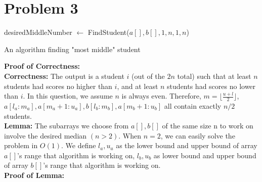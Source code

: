 \documentclass{article}
\begin{document}
\section{Problem 3}
\begin{algorithm}[!ht]
\DontPrintSemicolon
{}
    
    desiredMiddleNumber $\leftarrow$ FindStudent($a[],b[],1,n,1,n$)
      \;
\caption{An algorithm finding "most middle" student}
\end{algorithm}
\textbf{Proof of Correctness:}\\
\textbf{Correctness:} The output is a student $i$ (out
of the $2n$ total) such that at least $n$ students had scores no higher than $i$, and at least $n$ students had scores no lower than $i$. In this question, we assume $n$ is always even. Therefore, $m = \lfloor\frac{u+l}{2}\rfloor$, $a[l_a:m_a], a[m_a+1:u_a], b[l_b:m_b], a[m_b+1:u_b]$ all contain exactly $n/2$ students. \\
\textbf{Lemma:} The subarrays we choose from $a[], b[]$ of the same size n to work on involve the desired median $(n>2)$. When $n=2$, we can easily solve the problem in $O(1)$. We define $l_a, u_a$ as the lower bound and upper bound of array $a[]$'s range that algorithm is working on, $l_b, u_b$ as lower bound and upper bound of array $b[]$'s range that algorithm is working on.
\\\textbf{Proof of Lemma:} 
\end{document}
